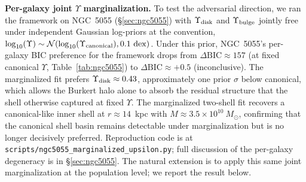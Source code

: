 \documentclass[linenumbers]{aastex701}
\newcommand{\Yt}{\Upsilon}
\newcommand{\Ydisk}{\Upsilon_{\rm disk}}
\newcommand{\Ybulge}{\Upsilon_{\rm bulge}}
\newcommand{\Msun}{M_\odot}
\begin{document}
\textbf{Per-galaxy joint $\Yt$ marginalization.} To test the adversarial direction, we ran the framework on NGC~5055 (\S\ref{sec:ngc5055}) with $\Ydisk$ and $\Ybulge$ jointly free under independent Gaussian log-priors at the \citet{Li2020} convention, $\log_{10}(\Yt) \sim \mathcal{N}(\log_{10}(\Yt_{\rm canonical}), 0.1~\mathrm{dex})$. Under this prior, NGC~5055's per-galaxy BIC preference for the framework drops from $\Delta\mathrm{BIC} \approx 157$ (at fixed canonical $\Yt$, Table~\ref{tab:ngc5055}) to $\Delta\mathrm{BIC} \approx +0.5$ (inconclusive). The marginalized fit prefers $\Ydisk \approx 0.43$, approximately one prior $\sigma$ below canonical, which allows the Burkert halo alone to absorb the residual structure that the shell otherwise captured at fixed $\Yt$. The marginalized two-shell fit recovers a canonical-like inner shell at $r \approx 14$~kpc with $M \approx 3.5 \times 10^{10}~\Msun$, confirming that the canonical shell basin remains detectable under marginalization but is no longer decisively preferred. Reproduction code is at \texttt{scripts/ngc5055\_marginalized\_upsilon.py}; full discussion of the per-galaxy degeneracy is in \S\ref{sec:ngc5055}. The natural extension is to apply this same joint marginalization at the population level; we report the result below.
\end{document}
